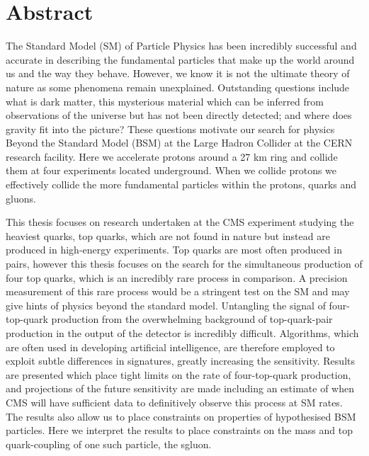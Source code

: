 \label{c:abstract}
\chapter*{Abstract} 
\small{
The Standard Model (SM) of Particle Physics has been incredibly successful and accurate in describing the fundamental particles that make up the world around us and the way they behave. However, we know it is not the ultimate theory of nature as some phenomena remain unexplained. Outstanding questions include what is dark matter, this mysterious material which can be inferred from observations of the universe but has not been directly detected; and where does gravity fit into the picture? These questions motivate our search for physics Beyond the Standard Model (BSM) at the Large Hadron Collider at the CERN research facility. Here we accelerate protons around a 27 km ring and collide them at four experiments located underground. When we collide protons we effectively collide the more fundamental particles within the protons, quarks and gluons.

This thesis focuses on research undertaken at the CMS experiment studying the heaviest quarks, top quarks, which are not found in nature but instead are produced in high-energy experiments. Top quarks are most often produced in pairs, however this thesis focuses on the search for the simultaneous production of four top quarks, which is an incredibly rare process in comparison. A precision measurement of this rare process would be a stringent test on the SM and may give hints of physics beyond the standard model. 
Untangling the signal of four-top-quark production from the overwhelming background of top-quark-pair production in the output of the detector is incredibly difficult. Algorithms, which are often used in developing artificial intelligence, are therefore employed to exploit subtle differences in signatures, greatly increasing the sensitivity.
Results are presented which place tight limits on the rate of four-top-quark production, and projections of the future sensitivity are made including an estimate of when CMS will have sufficient data to definitively observe this process at SM rates. The results also allow us to place constraints on properties of hypothesised BSM particles. Here we interpret the results to place constraints on the mass and top quark-coupling of one such particle, the sgluon.}

\clearpage
